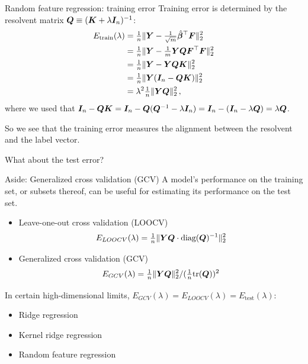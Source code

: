 \documentclass[10pt, aspectratio=169]{beamer}
\newcommand{\bbeta}{\bm{\beta}}
\begin{document}
\begin{frame}[t]{Random feature regression: training error}
Training error is determined by the resolvent matrix ${\boldsymbol Q}\equiv ({\boldsymbol K} + \lambda {\boldsymbol I}_n)^{-1}$:
\begin{align*}
E_{\text{train}}(\lambda) &=  \tfrac{1}{n}\|\YY - \tfrac{1}{\sqrt{m}}{\hat{\bbeta}}^\top \FF\|_2^2\\
&= \tfrac{1}{n}\|\YY-\tfrac{1}{m}\YY \QQ \FF^\top\FF\|_2^2\\
&= \tfrac{1}{n}\|\YY-\YY \QQ \KK\|_2^2\\
&= \tfrac{1}{n}\|\YY(\II_n-\QQ \KK)\|_2^2\\
&= \lambda^2\tfrac{1}{n}\|\YY\QQ\|_2^2\,,
\end{align*}
where we used that ${\boldsymbol I}_n - {\boldsymbol Q} {\boldsymbol K} = {\boldsymbol I}_n - {\boldsymbol Q} ({\boldsymbol Q}^{-1} - \lambda {\boldsymbol I}_n) =  {\boldsymbol I}_n -  ({\boldsymbol I}_n - \lambda {\boldsymbol Q}) = \lambda {\boldsymbol Q}$.
\pause

So we see that the training error measures the alignment between the resolvent and the label vector.

What about the test error?
\end{frame}
\begin{frame}[t]{Aside: Generalized cross validation (GCV)}
A model's performance on the training set, or subsets thereof, can be useful for estimating its performance on the test set.
\begin{itemize}
    \item Leave-one-out cross validation (LOOCV)\\
$$E_{LOOCV}(\lambda) = \tfrac{1}{n}\|{\boldsymbol Y}{\boldsymbol Q}\cdot\text{diag}({\boldsymbol Q})^{-1}\|_2^2 $$
    \item Generalized cross validation (GCV)\\
    $$E_{GCV}(\lambda) = \tfrac{1}{n}\|{\boldsymbol Y}{\boldsymbol Q}\|_2^2/(\tfrac{1}{n}\text{tr}({\boldsymbol Q}))^2$$
\end{itemize}
\pause

In certain high-dimensional limits, $E_{GCV}(\lambda) = E_{LOOCV}(\lambda) = E_{\text{test}}(\lambda)$:
\begin{itemize}
    \item Ridge regression~\citep{hastie2019surprises}
    \item Kernel ridge regression~\citep{jacot2020kernel}
    \item Random feature regression~\citep{adlam2020neural}
\end{itemize}
\end{frame}
\end{document}
